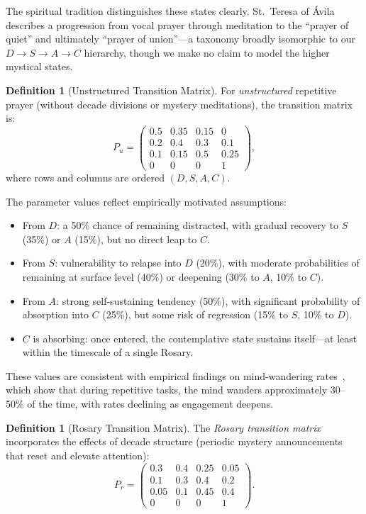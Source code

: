 \documentclass[journal]{IEEEtran}
\theoremstyle{definition}
\newtheorem{definition}[theorem]{Definition}
\theoremstyle{remark}
\begin{document}
The spiritual tradition distinguishes these states clearly. St.\ Teresa of \'Avila describes a progression from vocal prayer through meditation to the ``prayer of quiet'' and ultimately ``prayer of union''---a taxonomy broadly isomorphic to our $D \to S \to A \to C$ hierarchy, though we make no claim to model the higher mystical states.

\begin{definition}[Unstructured Transition Matrix]\label{def:unstructured}
For \emph{unstructured} repetitive prayer (without decade divisions or mystery meditations), the transition matrix is:
\begin{equation}\label{eq:Punstructured}
P_u = \begin{pmatrix}
0.5 & 0.35 & 0.15 & 0 \\
0.2 & 0.4 & 0.3 & 0.1 \\
0.1 & 0.15 & 0.5 & 0.25 \\
0 & 0 & 0 & 1
\end{pmatrix},
\end{equation}
where rows and columns are ordered $(D, S, A, C)$.
\end{definition}

The parameter values reflect empirically motivated assumptions:
\begin{itemize}
\item From $D$: a 50\% chance of remaining distracted, with gradual recovery to $S$ (35\%) or $A$ (15\%), but no direct leap to $C$.
\item From $S$: vulnerability to relapse into $D$ (20\%), with moderate probabilities of remaining at surface level (40\%) or deepening (30\% to $A$, 10\% to $C$).
\item From $A$: strong self-sustaining tendency (50\%), with significant probability of absorption into $C$ (25\%), but some risk of regression (15\% to $S$, 10\% to $D$).
\item $C$ is absorbing: once entered, the contemplative state sustains itself---at least within the timescale of a single Rosary.
\end{itemize}

These values are consistent with empirical findings on mind-wandering rates~\cite{smallwood2006,braboszcz2011}, which show that during repetitive tasks, the mind wanders approximately 30--50\% of the time, with rates declining as engagement deepens.

\begin{definition}[Rosary Transition Matrix]\label{def:rosary}
The \emph{Rosary transition matrix} incorporates the effects of decade structure (periodic mystery announcements that reset and elevate attention):
\begin{equation}\label{eq:Prosary}
P_r = \begin{pmatrix}
0.3 & 0.4 & 0.25 & 0.05 \\
0.1 & 0.3 & 0.4 & 0.2 \\
0.05 & 0.1 & 0.45 & 0.4 \\
0 & 0 & 0 & 1
\end{pmatrix}.
\end{equation}
\end{definition}
\end{document}
